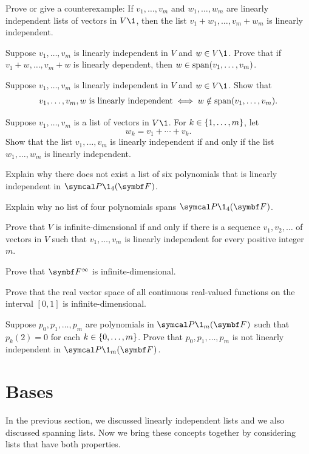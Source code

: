 \begin{exercises}
\exercise
Prove or give a counterexample: If $v_1, \dots, v_m$ and $w_1, \dots, w_m$ are linearly independent lists of vectors in $V\1$, then the list $v_1 + w_1, \dots, v_m + w_m$ is linearly independent.


\exercise
Suppose $v_1, \dots, v_m$ is linearly independent in $V$ and $w \in V\1$.  Prove that
if $v_1 + w, \dots, v_m + w$
is linearly dependent, then $w \in \operatorname{span}(v_1, \dots, v_m)$.


\exercise
Suppose $v_1, \dots, v_m$ is linearly independent in $V$ and $w \in V\1$. Show that
\[
v_1, \dots, v_m, w \text{ is linearly independent} \iff w \notin \operatorname{span} (v_1, \dots, v_m).
\]
\exercisedisplayend


\exercise
Suppose $v_1, \ldots, v_m$ is a list of vectors in $V\1$. For $k \in \{1, \ldots, m\}$, let\label{2ind}
\[
w_k = v_1 + \cdots + v_k.
\]
Show that the list $v_1, \ldots, v_m$ is linearly independent if and only if the list $w_1, \ldots, w_m$ is linearly independent.


\exercise
Explain why there does not exist a list of six polynomials that is linearly independent in $\P\1_4(\F{})$.


\exercise
Explain why no list of four polynomials spans $\P\1_4(\F{})$.


\exercise
Prove that $V$ is infinite-dimensional if and only if there is a
sequence $v_1, v_2, \dots$ of vectors in $V$ such that $v_1, \dots, v_m$ is
linearly independent for every positive integer $m$.\label{2infdim}


\exercise
Prove that $\F{\infty}$ is infinite-dimensional.


\exercise
Prove that the real vector space of all continuous real-valued
functions on the interval $[0, 1]$ is infinite-dimensional.


\exercise
Suppose $p_0, p_1, \dots, p_m$ are polynomials in $\P\1_m(\F{})$ such that
$p_k(2) = 0$ for each $k \in \{0, \ldots, m\}$.  Prove that $p_0, p_1, \dots, p_m$ is not linearly
independent in $\P\1_m(\F{})$.


\end{exercises}

\CrCom

\section{Bases} \label{bases}

In the previous section, we discussed linearly independent lists and we also discussed spanning lists. Now we bring these concepts together by considering lists that have both properties.

